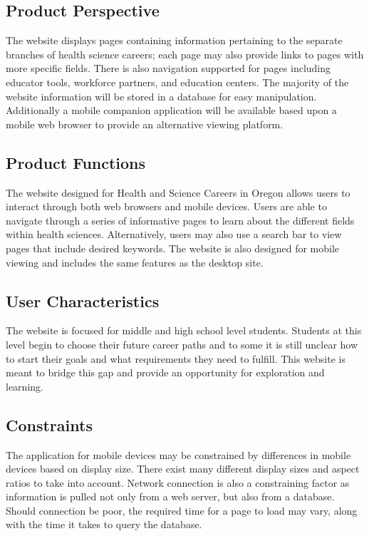 \documentclass[letterpaper,10pt, draftclsnofoot,onecolumn]{IEEEtran}
\begin{document}
{{{{\subsection[Product Perspective]{\color{black}
Product Perspective}
{\color{black}\normalsize\noindent
{The website displays pages containing information pertaining to the separate branches of health science careers; each page may also provide links to pages with more specific fields. 
There is also navigation supported for pages including educator tools, workforce partners, and education centers. 
The majority of the website information will be stored in a database for easy manipulation. 
Additionally a mobile companion application will be available based upon a mobile web browser to provide an alternative viewing platform.}



\subsection[Product Functions]{\color{black}
Product Functions}
{\color{black}\normalsize\noindent
The website designed for Health and Science Careers in Oregon allows users to interact through both web browsers and mobile devices. 
Users are able to navigate through a series of informative pages to learn about the different fields within health sciences. 
Alternatively, users may also use a search bar to view pages that include desired keywords. 
The website is also designed for mobile viewing and includes the same features as the desktop site.}


\subsection[User Characteristics]{\color{black}
User Characteristics}
{\color{black}\normalsize\noindent
The website is focused for middle and high school level students. 
Students at this level begin to choose their future career paths and to some it is still unclear how to start their goals and what requirements they need to fulfill. 
This website is meant to bridge this gap and provide an opportunity for exploration and learning. }

\subsection[Constraints]{\color{black}
Constraints}
{\color{black}\normalsize\noindent
The application for mobile devices may be constrained by differences in mobile devices based on display size. 
There exist many different display sizes and aspect ratios to take into account. 
Network connection is also a constraining factor as information is pulled not only from a web server, but also from a database. 
Should connection be poor, the required time for a page to load may vary, along with the time it takes to query the database.}


}}}}}
\end{document}
